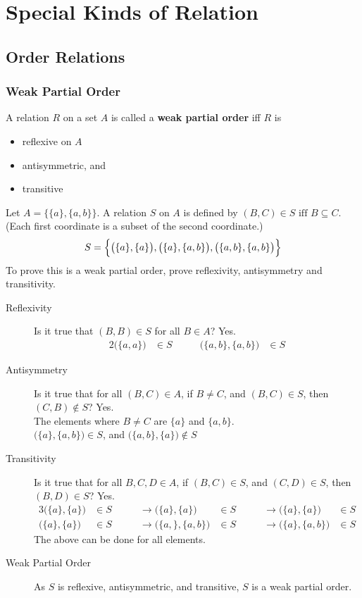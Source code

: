 \documentclass[../notes.tex]{subfiles}
\begin{document}
	\ifSubfilesClassLoaded{\setcounter{chapter}{5}}{}
	\chapter{Special Kinds of Relation}
		\section{Order Relations}
			\subsection{Weak Partial Order}
				A relation $R$ on a set $A$ is called a \textbf{weak partial order} iff $R$ is
				\begin{itemize}
					\item reflexive on $A$
					\item antisymmetric, and
					\item transitive
				\end{itemize}
				\begin{example}
					Let $A = \bigl\{\{a\}, \{a, b\}\bigr\}$. A relation $S$ on $A$ is defined by $(B, C) \in S \text{ iff } B \subseteq C$. (Each first coordinate is a subset of the second coordinate.)
					\begin{align*}
						S = \Bigl\{\bigl(\{a\}, \{a\}\bigr), \bigl(\{a\}, \{a, b\}\bigr), \bigl(\{a, b\}, \{a, b\}\bigr)\Bigr\}
					\end{align*}
					To prove this is a weak partial order, prove reflexivity, antisymmetry and transitivity.
					\begin{description}
						\item[Reflexivity] Is it true that $(B, B) \in S$ for all $B \in A$? Yes.
							\begin{alignat*}{2}
								\bigl(\{a, a\}\bigr) &\in S \qquad & \bigl(\{a, b\}, \{a, b\}\bigr) &\in S
							\end{alignat*}
						\item[Antisymmetry] Is it true that for all $(B, C) \in A$, if $B \neq C$, and $(B, C) \in S$, then $(C, B) \notin S$? Yes.\\
							The elements where $B \neq C$ are $\{a\}$ and $\{a, b\}$.\\
							$\bigl(\{a\}, \{a, b\}\bigr) \in S$, and $\bigl(\{a, b\}, \{a\}\bigr) \notin S$
						\item[Transitivity] Is it true that for all $B, C, D \in A$, if $(B, C) \in S$, and $(C, D) \in S$, then $(B, D) \in S$? Yes.
							\begin{alignat*}{3}
								\bigl(\{a\}, \{a\}\bigr) &\in S \qquad &\rightarrow \bigl(\{a\}, \{a\}\bigr) &\in S \qquad &\rightarrow \bigl(\{a\}, \{a\}\bigr) &\in S\\
								\bigl(\{a\}, \{a\}\bigr) &\in S \qquad &\rightarrow \bigl(\{a,\}, \{a, b\}\bigr) &\in S \qquad &\rightarrow \bigl(\{a\}, \{a, b\}\bigr) &\in S
							\end{alignat*}
							The above can be done for all elements.
						\item[Weak Partial Order] As $S$ is reflexive, antisymmetric, and transitive, $S$ is a weak partial order.
					\end{description}
				\end{example}
\end{document}
